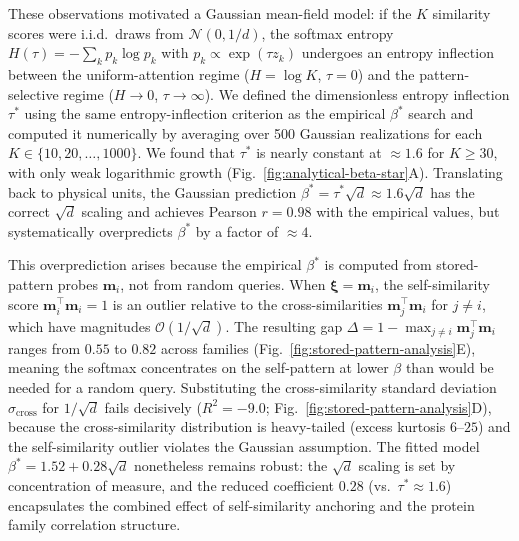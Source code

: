 \documentclass[10pt]{article}
\begin{document}
These observations motivated a Gaussian mean-field model: if the $K$ similarity scores were i.i.d.\ draws from $\mathcal{N}(0, 1/d)$, the softmax entropy $H(\tau) = -\sum_k p_k \log p_k$ with $p_k \propto \exp(\tau z_k)$ undergoes an entropy inflection between the uniform-attention regime ($H = \log K$, $\tau = 0$) and the pattern-selective regime ($H \to 0$, $\tau \to \infty$). We defined the dimensionless entropy inflection $\tau^*$ using the same entropy-inflection criterion as the empirical $\beta^*$ search and computed it numerically by averaging over 500 Gaussian realizations for each $K \in \{10, 20, \ldots, 1000\}$. We found that $\tau^*$ is nearly constant at $\approx 1.6$ for $K \geq 30$, with only weak logarithmic growth (Fig.~\ref{fig:analytical-beta-star}A). Translating back to physical units, the Gaussian prediction $\beta^* = \tau^*\sqrt{d} \approx 1.6\sqrt{d}$ has the correct $\sqrt{d}$ scaling and achieves Pearson $r = 0.98$ with the empirical values, but systematically overpredicts $\beta^*$ by a factor of $\approx 4$.

This overprediction arises because the empirical $\beta^*$ is computed from stored-pattern probes $\mathbf{m}_i$, not from random queries. When $\boldsymbol{\xi} = \mathbf{m}_i$, the self-similarity score $\mathbf{m}_i^\top\mathbf{m}_i = 1$ is an outlier relative to the cross-similarities $\mathbf{m}_j^\top\mathbf{m}_i$ for $j \neq i$, which have magnitudes $\mathcal{O}(1/\sqrt{d})$. The resulting gap $\Delta = 1 - \max_{j\neq i}\mathbf{m}_j^\top\mathbf{m}_i$ ranges from $0.55$ to $0.82$ across families (Fig.~\ref{fig:stored-pattern-analysis}E), meaning the softmax concentrates on the self-pattern at lower $\beta$ than would be needed for a random query. Substituting the cross-similarity standard deviation $\sigma_{\mathrm{cross}}$ for $1/\sqrt{d}$ fails decisively ($R^2 = -9.0$; Fig.~\ref{fig:stored-pattern-analysis}D), because the cross-similarity distribution is heavy-tailed (excess kurtosis $6$--$25$) and the self-similarity outlier violates the Gaussian assumption. The fitted model $\beta^* = 1.52 + 0.28\sqrt{d}$ nonetheless remains robust: the $\sqrt{d}$ scaling is set by concentration of measure, and the reduced coefficient $0.28$ (vs.\ $\tau^* \approx 1.6$) encapsulates the combined effect of self-similarity anchoring and the protein family correlation structure.
\end{document}
